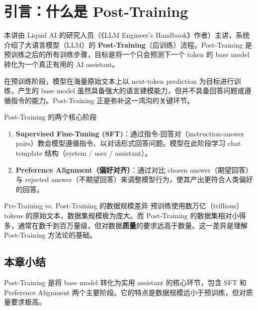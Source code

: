 \section{引言：什么是 Post-Training}

本讲由 Liquid AI 的研究人员（《LLM Engineer's Handbook》作者）主讲，系统介绍了大语言模型（LLM）的 \textbf{Post-Training}（后训练）流程。Post-Training 是预训练之后的所有训练步骤，目标是将一个只会预测下一个 token 的 base model 转化为一个真正有用的 AI assistant。

在预训练阶段，模型在海量原始文本上以 next-token prediction 为目标进行训练，产生的 base model 虽然具备强大的语言建模能力，但并不具备回答问题或遵循指令的能力。Post-Training 正是弥补这一鸿沟的关键环节。

\begin{importantbox}{Post-Training 的两个核心阶段}
\begin{enumerate}
    \item \textbf{Supervised Fine-Tuning (SFT)}：通过指令-回答对（instruction-answer pairs）教会模型遵循指令、以对话形式回答问题。模型在此阶段学习 chat template 结构（system / user / assistant）。
    \item \textbf{Preference Alignment（偏好对齐）}：通过对比 chosen answer（期望回答）与 rejected answer（不期望回答）来调整模型行为，使其产出更符合人类偏好的回答。
\end{enumerate}
\end{importantbox}

\begin{knowledgebox}{Pre-Training vs. Post-Training 的数据规模差异}
预训练使用数万亿（trillions）tokens 的原始文本，数据集规模极为庞大。而 Post-Training 的数据集相对小得多，通常在数千到百万量级，但对数据\textbf{质量}的要求远高于数量。这一差异是理解 Post-Training 方法论的基础。
\end{knowledgebox}

\subsection{本章小结}

Post-Training 是将 base model 转化为实用 assistant 的核心环节，包含 SFT 和 Preference Alignment 两个主要阶段。它的特点是数据规模远小于预训练，但对质量要求极高。

\newpage
